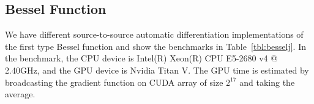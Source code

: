\documentclass{article}
\newcommand{\<}{\langle}
\renewcommand{\>}{\rangle}
\newcommand{\Tbl}[1]{Table~\ref{#1}}
\newcommand{\ra}[1]{\renewcommand{\arraystretch}{#1}}
\theoremstyle{definition}\newtheorem{definition}{\textit{Definition}}
\begin{document}
\subsection{Bessel Function}
We have different source-to-source automatic differentiation implementations of the first type Bessel function and show the benchmarks in \Tbl{tbl:besselj}.
In the benchmark, the CPU device is Intel(R) Xeon(R) CPU E5-2680 v4 @ 2.40GHz, and the GPU device is Nvidia Titan V. The GPU time is estimated by broadcasting the gradient function on CUDA array of size $2^{17}$ and taking the average.
\begin{table}[h!]\centering
\begin{minipage}{0.8\columnwidth}
\ra{1.3}
    \caption{Time and space used for computing gradients of the first kind Bessel function $J_2(1.0)$.
}\label{tbl:besselj}
\end{minipage}
\end{table}
\end{document}
